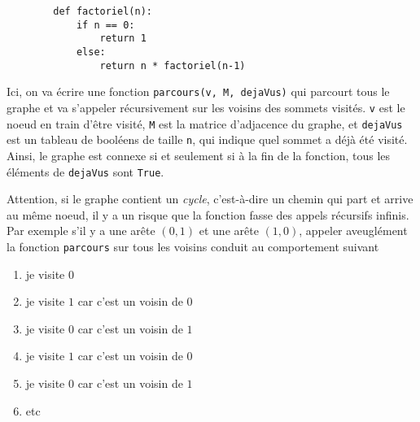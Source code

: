     \begin{verbatim}
        def factoriel(n):
            if n == 0:
                return 1
            else:
                return n * factoriel(n-1)
    \end{verbatim}

    Ici, on va écrire une fonction \texttt{parcours(v, M, dejaVus)} qui parcourt tous le graphe et va s'appeler récursivement sur les voisins des sommets visités. \texttt{v} est le noeud en train d'être visité, \texttt{M} est la matrice d'adjacence du graphe, et \texttt{dejaVus} est un tableau de booléens de taille \texttt{n}, qui indique quel sommet a déjà été visité. Ainsi, le graphe est connexe si et seulement si à la fin de la fonction, tous les éléments de \texttt{dejaVus} sont \texttt{True}.

    Attention, si le graphe contient un \textit{cycle}, c'est-à-dire un chemin qui part et arrive au même noeud, il y a un risque que la fonction fasse des appels récursifs infinis. Par exemple s'il y a une arête $ (0, 1) $ et une arête $ (1, 0) $, appeler aveuglément la fonction \texttt{parcours} sur tous les voisins conduit au comportement suivant
\begin{enumerate}
    \item je visite $ 0 $
    \item je visite $ 1 $ car c'est un voisin de $ 0 $
    \item je visite $ 0 $ car c'est un voisin de $ 1 $
    \item je visite $ 1 $ car c'est un voisin de $ 0 $
    \item je visite $ 0 $ car c'est un voisin de $ 1 $
    \item etc
\end{enumerate}

